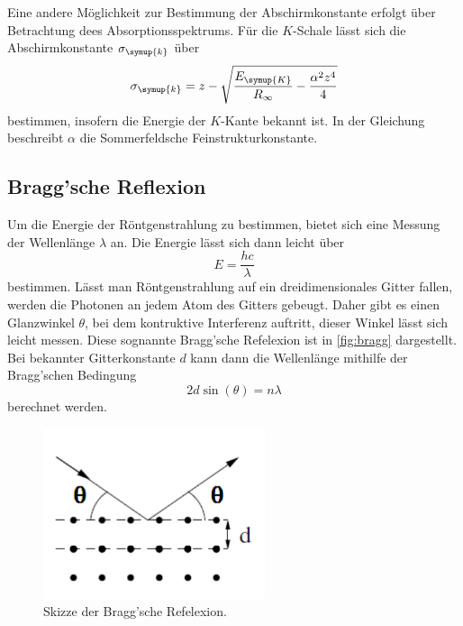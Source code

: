 Eine andere Möglichkeit zur Bestimmung der Abschirmkonstante erfolgt über Betrachtung dees Absorptionsspektrums.
Für die $K$-Schale lässt sich die Abschirmkonstante $\sigma_{\symup{k}}$ über
\begin{equation}
    \label{eqn:sigma_K}
    \sigma_{\symup{k}} = z - \sqrt{\frac{E_{\symup{K}}}{R_\infty} - \frac{\alpha^2 z^4}{4}}
\end{equation}
bestimmen, insofern die Energie der $K$-Kante bekannt ist.
In der Gleichung beschreibt $\alpha$ die Sommerfeldsche Feinstrukturkonstante.

\subsection{Bragg'sche Reflexion}
\label{sec:Bragg'sche Reflexion}

Um die Energie der Röntgenstrahlung zu bestimmen, bietet sich eine Messung der Wellenlänge $\lambda$ an.
Die Energie lässt sich dann leicht über
\begin{equation*}
    E=\frac{hc}{\lambda}
\end{equation*}
bestimmen.
Lässt man Röntgenstrahlung auf ein dreidimensionales Gitter fallen, werden die Photonen an jedem Atom des Gitters gebeugt.
Daher gibt es einen Glanzwinkel $\theta$, bei dem kontruktive Interferenz auftritt, dieser Winkel lässt sich leicht messen.
Diese sognannte Bragg'sche Refelexion ist in \autoref{fig:bragg} dargestellt.
Bei bekannter Gitterkonstante $d$ kann dann die Wellenlänge mithilfe der Bragg'schen Bedingung
\begin{equation}
    2d\sin(\theta)=n\lambda
\end{equation}
berechnet werden.

\begin{figure}[H]
    \centering
    \includegraphics[height=5cm]{content/pics/bragg.pdf}
    \caption{Skizze der Bragg'sche Refelexion.\cite{v602}}
    \label{fig:bragg}
\end{figure}
